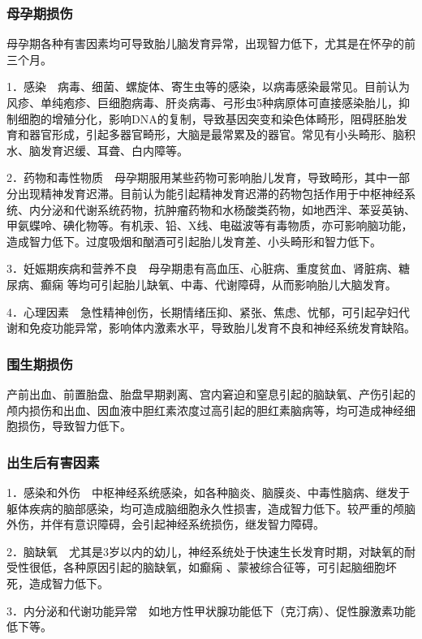 \subsubsection{母孕期损伤}

母孕期各种有害因素均可导致胎儿脑发育异常，出现智力低下，尤其是在怀孕的前三个月。

1．感染　病毒、细菌、螺旋体、寄生虫等的感染，以病毒感染最常见。目前认为风疹、单纯疱疹、巨细胞病毒、肝炎病毒、弓形虫5种病原体可直接感染胎儿，抑制细胞的增殖分化，影响DNA的复制，导致基因突变和染色体畸形，阻碍胚胎发育和器官形成，引起多器官畸形，大脑是最常累及的器官。常见有小头畸形、脑积水、脑发育迟缓、耳聋、白内障等。

2．药物和毒性物质　母孕期服用某些药物可影响胎儿发育，导致畸形，其中一部分出现精神发育迟滞。目前认为能引起精神发育迟滞的药物包括作用于中枢神经系统、内分泌和代谢系统药物，抗肿瘤药物和水杨酸类药物，如地西泮、苯妥英钠、甲氨蝶呤、碘化物等。有机汞、铅、X线、电磁波等有毒物质，亦可影响脑功能，造成智力低下。过度吸烟和酗酒可引起胎儿发育差、小头畸形和智力低下。

3．妊娠期疾病和营养不良　母孕期患有高血压、心脏病、重度贫血、肾脏病、糖尿病、癫痫
等均可引起胎儿缺氧、中毒、代谢障碍，从而影响胎儿大脑发育。

4．心理因素　急性精神创伤，长期情绪压抑、紧张、焦虑、忧郁，可引起孕妇代谢和免疫功能异常，影响体内激素水平，导致胎儿发育不良和神经系统发育缺陷。

\subsubsection{围生期损伤}

产前出血、前置胎盘、胎盘早期剥离、宫内窘迫和窒息引起的脑缺氧、产伤引起的颅内损伤和出血、因血液中胆红素浓度过高引起的胆红素脑病等，均可造成神经细胞损伤，导致智力低下。

\subsubsection{出生后有害因素}

1．感染和外伤　中枢神经系统感染，如各种脑炎、脑膜炎、中毒性脑病、继发于躯体疾病的脑部感染，均可造成脑细胞永久性损害，造成智力低下。较严重的颅脑外伤，并伴有意识障碍，会引起神经系统损伤，继发智力障碍。

2．脑缺氧　尤其是3岁以内的幼儿，神经系统处于快速生长发育时期，对缺氧的耐受性很低，各种原因引起的脑缺氧，如癫痫
、蒙被综合征等，可引起脑细胞坏死，造成智力低下。

3．内分泌和代谢功能异常　如地方性甲状腺功能低下（克汀病）、促性腺激素功能低下等。

